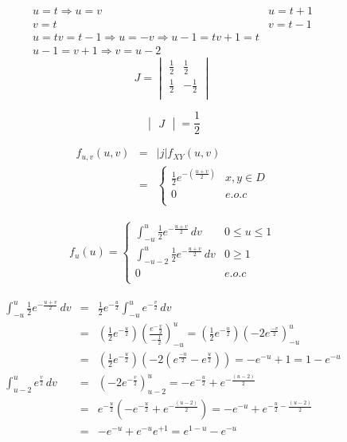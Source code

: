 \begin{eqnarray*}
u=t \Rightarrow u=v & u=t+1 \\
v=t & v= t-1 \\
u=t v=t-1 \Rightarrow u=-v \Rightarrow u-1=t v+1=t \\
u-1=v+1 \Rightarrow v=u-2
\end{eqnarray*}
\[J=
\begin{vmatrix}
\frac{1}{2} & \frac{1}{2}\\
\frac{1}{2} & -\frac{1}{2}\\
\end{vmatrix} 
\]

\[ 
\begin{vmatrix} J \end{vmatrix}=\frac{1}{2}
\]
 
\begin{eqnarray*} 
f_{u,v} \left(u,v \right) &=& |j| f_{XY}\left( u,v \right)\\
&=& 
\begin{cases}
\frac{1}{2} e^{-\left(\frac{u+v}{2} \right)} & x,y\in D \\
0 & e.o.c\\
\end{cases}
\end{eqnarray*}

\begin{eqnarray*} 
f_{u} \left(u \right) = \begin{cases}
\int _{-u}^{u}\frac{1}{2}e^{- \frac{u+v}{2} }\,dv & 0 \leq u \leq 1  \\

\int _{-u-2}^{u}\frac{1}{2}e^{- \frac{u+v}{2} }\,dv & 0 \geq 1  \\

0 & e.o.c\\
\end{cases}
\end{eqnarray*}

\begin{eqnarray*} 
\int _{-u}^{u}\frac{1}{2}e^{- \frac{u+v}{2} }\,dv &=&\frac{1}{2}e^{- \frac{u}{2} } \int _{-u}^{u} e^{- \frac{v}{2} } \,dv\\
&=& \left( \frac{1}{2} e^{-\frac{u}{2} } \right)\left(\frac{ e^-{\frac{v}{2} } }{-\frac{1}{2}}\right)_{-u}^{u}=
 \left( \frac{1}{2} e^{-\frac{u}{2} } \right)\left(-2 e^{\frac{-v}{2}}\right)_{-u}^{u}\\
 &=& \left( \frac{1}{2} e^{-\frac{u}{2} } \right)\left(-2 \left(e^{\frac{-u}{2}}- e^{\frac{u}{2}}\right)\right)= -e^{-u}+1=1-e^{-u}\\
 \int_{u-2}^{u} e^{\frac{v}{2} }\,dv &=& \left(-2e^{-\frac{v}{2} } \right)_{u-2}^{u}=-e^{-\frac{u}{2}}+ e^{-\frac{\left( u-2\right)}{2}}\\
 &=& e^{-\frac{u}{2}}\left(-e^{-\frac{u}{2}}+ e^{-\frac{\left( u-2\right)}{2}} \right)= -e^{-u}+e^{-\frac{u}{2} -\frac{\left( u-2\right)}{2}}\\
 &=& -e^{-u}+e^{-u}e^{+1} = e^{1-u}-e^{-u}
\end{eqnarray*}

